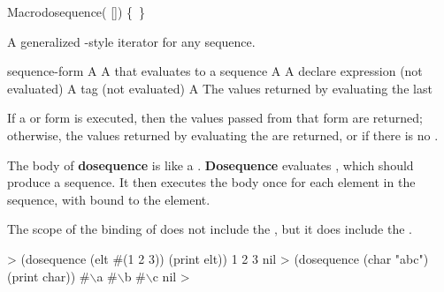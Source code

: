 \documentclass[10pt,twoside,english,pdftex]{article}
\begin{document}
\begin{functiondoc}{Macro}{dosequence}{( 
  []) \superstar{} 
  \mbox{\{ \vbar{} \}\superstar}
  \returns{} \superstar}
%
  
\fnsyntax

\fnpurpose A generalized -style iterator for any sequence.

\fnpackage {}

\fnmodule {}

\fnargs
\begin{args}{sequence-form}
\arg[var] A 
 A  that evaluates to a sequence
 A 
\arg[declarations] A declare expression (not evaluated)
\arg[tag] A  tag (not evaluated)
\arg[form] A 
\arg[results] The values returned by evaluating the last 
\end{args}

\fnreturns If a  or  form is executed, then
the values passed from that form are returned; otherwise, the values
returned by evaluating the  are returned, or \nil{} if
there is no .

\fndescription The body of \textbf{dosequence} is like a .
\textbf{Dosequence} evaluates , which should produce a
sequence. It then executes the body once for each element in the sequence,
with  bound to the element.

The scope of the binding of  does not include the
, but it does include the .

\fnexamples
%
\W\supp
\begin{example}
  > (dosequence (elt #(1 2 3)) (print elt))
  1 
  2 
  3 
  nil\goodpagebreak
  > (dosequence (char "abc") (print char))
  #\(\backslash\)a 
  #\(\backslash\)b 
  #\(\backslash\)c
  nil
  >
\end{example}

\end{functiondoc}

\end{document}
